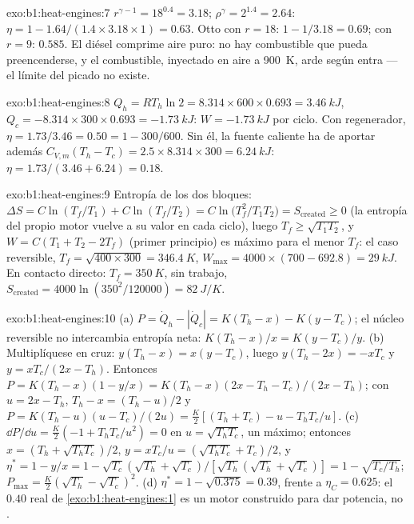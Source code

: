 \begin{solution}{exo:b1:heat-engines:7}
$r^{\gamma-1} = 18^{0.4} = 3.18$; $\rho^\gamma = 2^{1.4} = 2.64$: $\eta = 1 -
1.64/(1.4 \times 3.18 \times 1) = 0.63$. Otto con $r = 18$: $1 - 1/3.18 = 0.69$;
con $r = 9$: $0.585$. El diésel comprime aire puro: no hay combustible que
pueda preencenderse, y el combustible, inyectado en aire a \qty{900}{K}, arde
según entra --- el límite del picado no existe.
\end{solution}

\begin{solution}{exo:b1:heat-engines:8}
$Q_h = RT_h\ln2 = 8.314 \times 600 \times 0.693 = \qty{3.46}{kJ}$, $Q_c = -8.314
\times 300 \times 0.693 = \qty{-1.73}{kJ}$: $W = \qty{-1.73}{kJ}$ por ciclo. Con
regenerador, $\eta = 1.73/3.46 = 0.50 = 1 - 300/600$. Sin él, la fuente
caliente ha de aportar además $C_{V,m}(T_h - T_c) = 2.5 \times 8.314 \times 300 =
\qty{6.24}{kJ}$: $\eta = 1.73/(3.46 + 6.24) = 0.18$.
\end{solution}

\begin{solution}{exo:b1:heat-engines:9}
Entropía de los dos bloques: $\Delta S = C\ln(T_f/T_1) + C\ln(T_f/T_2) =
C\ln\bigl(T_f^2/T_1T_2\bigr) = S_{\mathrm{created}} \geq 0$ (la entropía del
propio motor vuelve a su valor en cada ciclo), luego $T_f \geq \sqrt{T_1T_2}$, y
$W = C(T_1 + T_2 - 2T_f)$ (primer principio) es máximo para el menor $T_f$:
el caso reversible, $T_f = \sqrt{400 \times 300} = \qty{346.4}{K}$,
$W_{\max} = 4000 \times (700 - 692.8) = \qty{29}{kJ}$. En contacto directo: $T_f =
\qty{350}{K}$, sin trabajo, $S_{\mathrm{created}} = 4000\ln(350^2/120000) =
\qty{82}{J/K}$.
\end{solution}

\begin{solution}{exo:b1:heat-engines:10}
(a) $P = \dot Q_h - |\dot Q_c| = K(T_h - x) - K(y - T_c)$; el núcleo reversible
no intercambia entropía neta: $K(T_h - x)/x = K(y - T_c)/y$. (b) Multiplíquese en cruz:
$y(T_h - x) = x(y - T_c)$, luego $y(T_h - 2x) = -xT_c$ y $y = xT_c/(2x - T_h)$.
Entonces $P = K(T_h - x)(1 - y/x) = K(T_h - x)(2x - T_h - T_c)/(2x - T_h)$; con
$u = 2x - T_h$, $T_h - x = (T_h - u)/2$ y $P = K(T_h - u)(u - T_c)/(2u) =
\tfrac{K}{2}[(T_h + T_c) - u - T_hT_c/u]$. (c) $\dd P/\dd u = \tfrac K2(-1 +
T_hT_c/u^2) = 0$ en $u = \sqrt{T_hT_c}$, un máximo; entonces $x = (T_h +
\sqrt{T_hT_c})/2$, $y = xT_c/u = (\sqrt{T_hT_c} + T_c)/2$, y $\eta^\ast = 1 - y/x
= 1 - \sqrt{T_c}(\sqrt{T_h} + \sqrt{T_c})/[\sqrt{T_h}(\sqrt{T_h} + \sqrt{T_c})] = 1 -
\sqrt{T_c/T_h}$; $P_{\max} = \tfrac K2(\sqrt{T_h} - \sqrt{T_c})^2$. (d)
$\eta^\ast = 1 - \sqrt{0.375} = 0.39$, frente a $\eta_C = 0.625$: el $0.40$ real
de \cref{exo:b1:heat-engines:1} es un motor construido para dar potencia, no
.
\end{solution}

